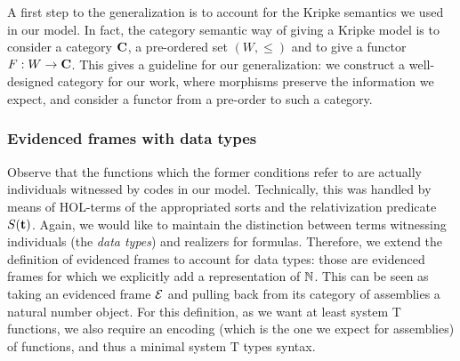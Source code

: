 \documentclass[a4paper,UKenglish,cleveref, autoref, thm-restate]{lipics-v2021}
\begin{document}
A first step to the generalization is to account for the Kripke semantics we used in our model.
In fact, the category semantic way of giving a Kripke model is to consider a category $\mathbf{C}$,
a pre-ordered set $(W, \leq)$ and to give a functor $F : W \to \mathbf{C}$.
This gives a guideline for our generalization: we construct a well-designed category for our work,
where morphisms preserve the information we expect, and consider a functor from a pre-order to such a category.


\subsubsection{Evidenced frames with data types}
Observe that the functions which the former conditions refer to
are actually individuals witnessed by codes in our model.
Technically, this was handled by means of HOL-terms of the appropriated sorts
and the relativization predicate $S(\mathbf{t})$.
Again, we would like to maintain the distinction between terms witnessing individuals (the \emph{data types})
and realizers for formulas.
Therefore, we extend the definition of evidenced frames to account for data types:
those are evidenced frames for which we explicitly add a representation of $\mathbb N$.
This can be seen as taking an evidenced frame $\mathcal{E}$
and pulling back from its category of assemblies a natural number object.
For this definition, as we want at least system T functions,
we also require an encoding (which is the one we expect for assemblies)
of functions, and thus a minimal system T types syntax.
\end{document}
